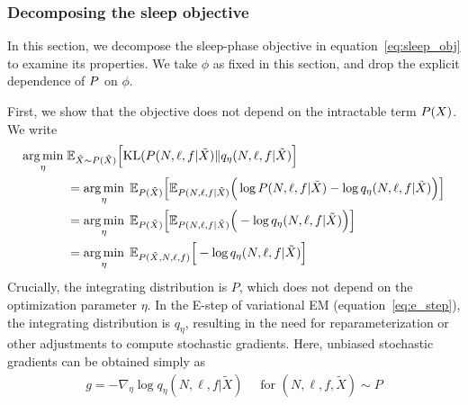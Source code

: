 
\subsubsection{Decomposing the sleep objective}
\label{sec:sleep_details}
In this section, we decompose the sleep-phase objective in equation~\eqref{eq:sleep_obj} to examine its properties. 
We take $\phi$ as fixed in this section, and drop the explicit dependence of $P$ on $\phi$.

First, we show that the objective does not depend on the intractable term $P(X)$. 
We write
\begin{align}
 \operatorname*{arg\,min}_{\eta} \; & \mathbb{E}_{\tilde X \sim P(\tilde X)}\Big[ \mathrm{KL}(P(N, \ell, f | \tilde X) \| q_\eta(N, \ell, f | \tilde X)\Big] \\
  &=\operatorname*{arg\,min}_{\eta} \; \mathbb E_{P(\tilde X)}\Big[\mathbb E_{P(N, \ell, f | \tilde X)}\Big(\log P(N, \ell, f | \tilde X) - \log q_\eta(N, \ell, f | \tilde X) \Big)\Big]\\
&=\operatorname*{arg\,min}_{\eta} \; \mathbb E_{P(\tilde X)}\Big[\mathbb E_{P(N, \ell, f | \tilde X)}\Big( - \log q_\eta(N, \ell, f | \tilde X) \Big)\Big]\\
&=\operatorname*{arg\,min}_{\eta} \; \mathbb E_{P(\tilde X, N, \ell, f)}\Big[- \log q_\eta(N, \ell, f | \tilde X) \Big]\label{eq:sleep_loss_simple}
\end{align}
Crucially, the integrating distribution is $P$, which does not depend on the optimization parameter $\eta$.
In the E-step of variational EM (equation~\eqref{eq:e_step}), the integrating distribution is $q_\eta$, resulting in the need for reparameterization or other adjustments to compute stochastic gradients. 
Here, unbiased stochastic gradients can be obtained simply as 
\begin{align}
    g = -\nabla_\eta \log q_\eta(N, \ell, f | \tilde X) \quad \text{ for } (N, \ell, f, \tilde X)\sim P
\end{align}

